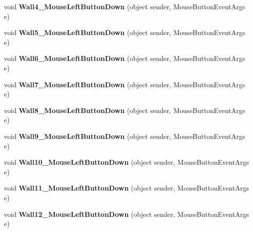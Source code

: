 \begin{DoxyCompactItemize}
\mbox{\label{class_r6_1_1_border_window_ae63050a88123f5572158813dddc7a705}} 
void {\bfseries Wall4\+\_\+\+Mouse\+Left\+Button\+Down} (object sender, Mouse\+Button\+Event\+Args e)
\item 
\mbox{\label{class_r6_1_1_border_window_abe7ff56728e1736cada6bdf273525eca}} 
void {\bfseries Wall5\+\_\+\+Mouse\+Left\+Button\+Down} (object sender, Mouse\+Button\+Event\+Args e)
\item 
\mbox{\label{class_r6_1_1_border_window_a4cbe5251c32c6e51f835a4925a5249e1}} 
void {\bfseries Wall6\+\_\+\+Mouse\+Left\+Button\+Down} (object sender, Mouse\+Button\+Event\+Args e)
\item 
\mbox{\label{class_r6_1_1_border_window_a60b5d38218f3c54cb27ec7c904b99a84}} 
void {\bfseries Wall7\+\_\+\+Mouse\+Left\+Button\+Down} (object sender, Mouse\+Button\+Event\+Args e)
\item 
\mbox{\label{class_r6_1_1_border_window_ac6d21a24a3248fce92c857e89a1053a9}} 
void {\bfseries Wall8\+\_\+\+Mouse\+Left\+Button\+Down} (object sender, Mouse\+Button\+Event\+Args e)
\item 
\mbox{\label{class_r6_1_1_border_window_abdf34d3d0ae56d71b8cf3bc06259eee1}} 
void {\bfseries Wall9\+\_\+\+Mouse\+Left\+Button\+Down} (object sender, Mouse\+Button\+Event\+Args e)
\item 
\mbox{\label{class_r6_1_1_border_window_a6a4322f45b82c8bab47a510692ddb0a3}} 
void {\bfseries Wall10\+\_\+\+Mouse\+Left\+Button\+Down} (object sender, Mouse\+Button\+Event\+Args e)
\item 
\mbox{\label{class_r6_1_1_border_window_ad53bff4e72cfc0434c3ae3df455c8248}} 
void {\bfseries Wall11\+\_\+\+Mouse\+Left\+Button\+Down} (object sender, Mouse\+Button\+Event\+Args e)
\item 
\mbox{\label{class_r6_1_1_border_window_af1c4d31ab8d189891d3267bcf288033d}} 
void {\bfseries Wall12\+\_\+\+Mouse\+Left\+Button\+Down} (object sender, Mouse\+Button\+Event\+Args e)

\end{DoxyCompactItemize}

